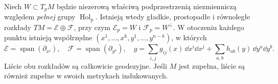 \begin{twierdzenie}
\label{thm:holonomia-lokalny-produkt}
Niech $W\subset T_pM$ będzie niezerową właściwą
podprzestrzenią niezmienniczą względem \emph{pełnej}
grupy $\operatorname{Hol}_p$. Istnieją wtedy gładkie,
prostopadłe i równoległe rozkłady
$TM=\mathcal E\oplus\mathcal F$, przy czym
$\mathcal E_p=W$ i $\mathcal F_p=W^\perp$.
W otoczeniu każdego punktu istnieją współrzędne
$(x^1,\ldots,x^k,y^1,\ldots,y^{n-k})$, w których
\begin{equation}\label{eq:holonomia-lokalny-produkt}
 \mathcal E=\operatorname{span}(\partial_{x^i}),\quad
 \mathcal F=\operatorname{span}(\partial_{y^a}),\quad
 g=\sum_{i,j}g_{ij}(x)\,\dd x^i\dd x^j
   +\sum_{a,b}h_{ab}(y)\,\dd y^a\dd y^b.
\end{equation}
Liście obu rozkładów są całkowicie geodezyjne.
Jeśli $M$ jest zupełna, liście są również zupełne
w swoich metrykach indukowanych.
\end{twierdzenie}
